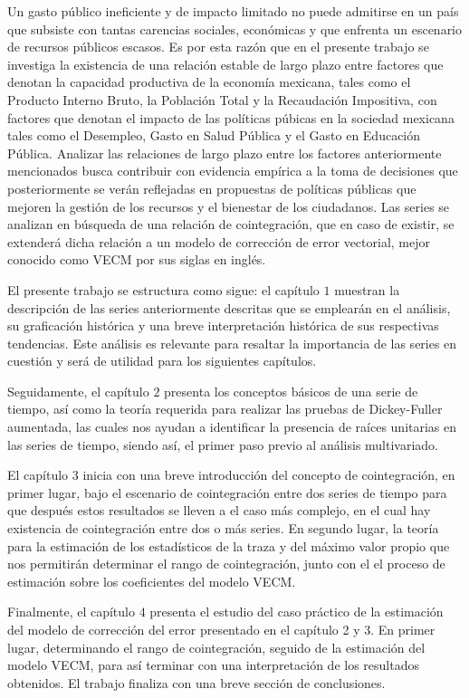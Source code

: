 




Un gasto público ineficiente y de impacto limitado no puede admitirse en un país que subsiste con tantas carencias sociales, económicas y que enfrenta un escenario de recursos públicos escasos. Es por esta razón que en el presente trabajo se investiga la existencia de una relación estable de largo plazo entre factores que denotan la capacidad productiva de la economía mexicana, tales como el Producto Interno Bruto, la Población Total y la Recaudación Impositiva, con factores que denotan el impacto de las políticas púbicas en la sociedad mexicana tales como el Desempleo, Gasto en Salud Pública y el Gasto en Educación Pública. Analizar las relaciones de largo plazo entre los factores anteriormente mencionados busca contribuir con evidencia empírica a la toma de decisiones que posteriormente se verán reflejadas en propuestas de políticas públicas que mejoren la gestión de los recursos y el bienestar de los ciudadanos. Las series se analizan en búsqueda de una relación de cointegración, que en caso de existir, se extenderá dicha relación a un modelo de corrección de error vectorial, mejor conocido como VECM por sus siglas en inglés.\bigskip

El presente trabajo se estructura como sigue: el capítulo $1$ muestran la descripción de las series anteriormente descritas que se emplearán en el análisis, su graficación histórica y una breve interpretación histórica de sus respectivas tendencias. Este análisis es relevante para resaltar la importancia de las series en cuestión y será de utilidad para los siguientes capítulos. \bigskip

Seguidamente, el capítulo $2$ presenta los conceptos básicos de una serie de tiempo, así como la teoría requerida para realizar las pruebas de Dickey-Fuller aumentada, las cuales nos ayudan a identificar la presencia de raíces unitarias en las series de tiempo, siendo así, el primer paso previo al análisis multivariado. \bigskip


El capítulo $3$ inicia con una breve introducción del concepto de cointegración, en primer lugar, bajo el escenario de cointegración entre dos series de tiempo para que después estos resultados se lleven a el caso más complejo, en el cual hay existencia de cointegración entre dos o más series. En segundo lugar, la teoría para la estimación de los estadísticos de la traza y del máximo valor propio que nos permitirán determinar el rango de cointegración, junto con el el proceso de estimación sobre los coeficientes del modelo VECM.\bigskip

Finalmente, el capítulo $4$ presenta el estudio del caso práctico de la estimación del modelo de corrección del error presentado en el capítulo 2 y 3. En primer lugar, determinando el rango de cointegración, seguido de la estimación del modelo VECM, para así terminar con una interpretación de los resultados obtenidos. El trabajo finaliza con una breve sección de conclusiones. 




